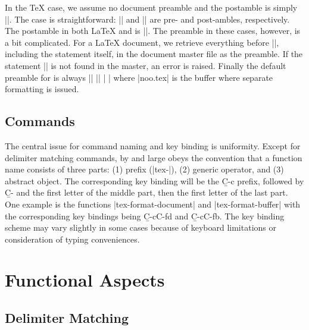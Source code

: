 In the {\TeX} case, we assume no document preamble and the postamble
is simply |\bye|.  The {\AmSTeX} case is straightforward:
|\document| and |\enddocument| are pre- and post-ambles, respectively.
The postamble in both {\LaTeX} and {\SliTeX} is ||.
The preamble in these cases, however, is a bit complicated.
For a {\LaTeX} document, we retrieve everything before ||,
including the statement itself, in the document master file as the preamble.
If the statement || is not found in the master, an error
is raised.  Finally the default preamble for {\SliTeX} is always
\begindisplay
||\cr
||\cr
|  |\cr
\enddisplay
where |noo.tex| is the buffer where separate formatting is issued.


\section{Commands}

\noindent 
The central issue for command naming and key binding is uniformity.
Except for delimiter matching commands,
{\TM} by and large obeys the convention that a function name
consists of three parts: (1) prefix (|tex-|), (2) generic operator, 
and (3) abstract object.
The corresponding key binding will be the {\b C-c} prefix, followed by {\b C-}
and the first letter of the middle part, then the first letter of the last 
part.  One example is the functions |tex-format-document| and
|tex-format-buffer| with the corresponding key bindings being
{\b C-c{\s}C-f{\s}d} and {\b C-c{\s}C-f{\s}b}.
The key binding scheme may vary slightly in some cases because
of keyboard limitations or consideration of typing conveniences.



\chapter{Functional Aspects}

\section{Delimiter Matching}

